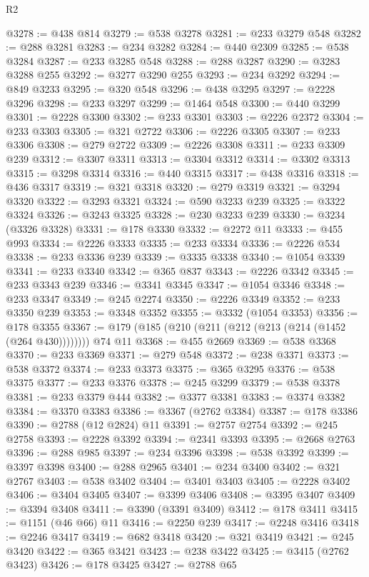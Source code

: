 \begin{lexlean}{R2}
\begin{coremodule}
@3278 := @438 @814
@3279 := @538 @3278
@3281 := @233 @3279 @548
@3282 := @288 @3281
@3283 := @234 @3282
@3284 := @440 @2309
@3285 := @538 @3284
@3287 := @233 @3285 @548
@3288 := @288 @3287
@3290 := @3283 @3288 @255
@3292 := @3277 @3290 @255
@3293 := @234 @3292
@3294 := @849 @3233
@3295 := @320 @548
@3296 := @438 @3295
@3297 := @2228 @3296
@3298 := @233 @3297
@3299 := @1464 @548
@3300 := @440 @3299
@3301 := @2228 @3300
@3302 := @233 @3301
@3303 := @2226 @2372
@3304 := @233 @3303
@3305 := @321 @2722
@3306 := @2226 @3305
@3307 := @233 @3306
@3308 := @279 @2722
@3309 := @2226 @3308
@3311 := @233 @3309 @239
@3312 := @3307 @3311
@3313 := @3304 @3312
@3314 := @3302 @3313
@3315 := @3298 @3314
@3316 := @440 @3315
@3317 := @438 @3316
@3318 := @436 @3317
@3319 := @321 @3318
@3320 := @279 @3319
@3321 := @3294 @3320
@3322 := @3293 @3321
@3324 := @590 @3233 @239
@3325 := @3322 @3324
@3326 := @3243 @3325
@3328 := @230 @3233 @239
@3330 := @3234 (@3326 @3328)
@3331 := @178 @3330
@3332 := @2272 @11
@3333 := @455 @993
@3334 := @2226 @3333
@3335 := @233 @3334
@3336 := @2226 @534
@3338 := @233 @3336 @239
@3339 := @3335 @3338
@3340 := @1054 @3339
@3341 := @233 @3340
@3342 := @365 @837
@3343 := @2226 @3342
@3345 := @233 @3343 @239
@3346 := @3341 @3345
@3347 := @1054 @3346
@3348 := @233 @3347
@3349 := @245 @2274
@3350 := @2226 @3349
@3352 := @233 @3350 @239
@3353 := @3348 @3352
@3355 := @3332 (@1054 @3353)
@3356 := @178 @3355
@3367 := @179 (@185 (@210 (@211 (@212 (@213 (@214 (@1452 (@264 @430)))))))) @74 @11
@3368 := @455 @2669
@3369 := @538 @3368
@3370 := @233 @3369
@3371 := @279 @548
@3372 := @238 @3371
@3373 := @538 @3372
@3374 := @233 @3373
@3375 := @365 @3295
@3376 := @538 @3375
@3377 := @233 @3376
@3378 := @245 @3299
@3379 := @538 @3378
@3381 := @233 @3379 @444
@3382 := @3377 @3381
@3383 := @3374 @3382
@3384 := @3370 @3383
@3386 := @3367 (@2762 @3384)
@3387 := @178 @3386
@3390 := @2788 (@12 @2824) @11
@3391 := @2757 @2754
@3392 := @245 @2758
@3393 := @2228 @3392
@3394 := @2341 @3393
@3395 := @2668 @2763
@3396 := @288 @985
@3397 := @234 @3396
@3398 := @538 @3392
@3399 := @3397 @3398
@3400 := @288 @2965
@3401 := @234 @3400
@3402 := @321 @2767
@3403 := @538 @3402
@3404 := @3401 @3403
@3405 := @2228 @3402
@3406 := @3404 @3405
@3407 := @3399 @3406
@3408 := @3395 @3407
@3409 := @3394 @3408
@3411 := @3390 (@3391 @3409)
@3412 := @178 @3411
@3415 := @1151 (@46 @66) @11
@3416 := @2250 @239
@3417 := @2248 @3416
@3418 := @2246 @3417
@3419 := @682 @3418
@3420 := @321 @3419
@3421 := @245 @3420
@3422 := @365 @3421
@3423 := @238 @3422
@3425 := @3415 (@2762 @3423)
@3426 := @178 @3425
@3427 := @2788 @65

\end{coremodule}
\end{lexlean}
